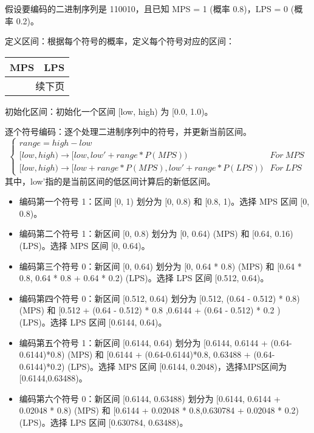 \documentclass{/Users/hi/Study/template/code}
\begin{document}
\begin{tcolorbox}
	\small
	假设要编码的二进制序列是 110010，且已知 MPS = 1 (概率 0.8)，LPS = 0 (概率 0.2)。
	\begin{serialNumber}
		\item 定义区间：根据每个符号的概率，定义每个符号对应的区间：
		\begin{longtable}{cc}
			\toprule
			\textbf{MPS} & \textbf{LPS} \\
			\midrule
			\endfirsthead
			\bottomrule()
			\multicolumn{2}{r}{续下页}
			\endfoot
			\bottomrule()
			\endlastfoot
			[0.0, 0.8)   & [0.8, 1.0)   \\
		\end{longtable}

		\item 初始化区间：初始化一个区间 [low, high) 为 [0.0, 1.0)。
		\item 逐个符号编码：逐个处理二进制序列中的符号，并更新当前区间。
		\begin{equation}
			\begin{cases}
				range = high - low                                                                    \\
				[low,high) \rightarrow  [low ,  low' + range * P( MPS ) )                 & For ~ MPS \\
				[low,high) \rightarrow  [low + range * P( MPS ) ,low' + range * P( LPS )) & For ~ LPS
			\end{cases}
		\end{equation}
		其中，low'指的是当前区间的低区间计算后的新低区间。

		\begin{itemize}
			\item 编码第一个符号 1：区间 [0, 1) 划分为 [0, 0.8) 和 [0.8, 1)。选择 MPS 区间 [0, 0.8)。
			\item 编码第二个符号 1：新区间 [0, 0.8) 划分为 [0, 0.64) (MPS) 和 [0.64, 0.16) (LPS)。选择 MPS 区间 [0, 0.64)。
			\item 编码第三个符号 0：新区间 [0, 0.64) 划分为 [0, 0.64 * 0.8) (MPS) 和 [0.64 * 0.8, 0.64 * 0.8 + 0.64 * 0.2) (LPS)。选择 LPS 区间 [0.512, 0.64)。
			\item 编码第四个符号 0：新区间 [0.512, 0.64) 划分为 [0.512, (0.64 - 0.512) * 0.8) (MPS) 和 [0.512 + (0.64 - 0.512) * 0.8 ,0.6144 + (0.64 - 0.512) * 0.2 ) (LPS)。选择 LPS 区间 [0.6144, 0.64)。
			\item 编码第五个符号 1：新区间 [0.6144, 0.64) 划分为 [0.6144, 0.6144 + (0.64-0.6144)*0.8) (MPS) 和 [0.6144 + (0.64-0.6144)*0.8, 0.63488 + (0.64-0.6144)*0.2) (LPS)。选择 MPS 区间 [0.6144, 0.2048)，选择MPS区间为 [0.6144,0.63488)。
			\item 编码第六个符号 0：新区间 [0.6144, 0.63488) 划分为 [0.6144, 0.6144 + 0.02048 * 0.8) (MPS) 和 [0.6144 + 0.02048 * 0.8,0.630784 + 0.02048 * 0.2) (LPS)。选择 LPS 区间 [0.630784, 0.63488)。
		\end{itemize}


\end{serialNumber}
\end{tcolorbox}
\end{document}
